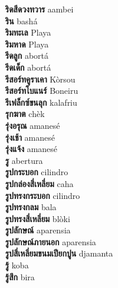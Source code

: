 \textbf{ ริดสีดวงทวาร  } aambei \\
\textbf{ ริน  } bashá \\
\textbf{ ริมทะเล  } Playa \\
\textbf{ ริมหาด  } Playa \\
\textbf{ รีดลูก  } abortá \\
\textbf{ รีดเด็ก  } abortá \\
\textbf{ รีสอร์ทคูราเคา  } Kòrsou \\
\textbf{ รีสอร์ทโบแนร์  } Boneiru \\
\textbf{ รีเฟล็กซ์ขนลุก  } kalafriu \\
\textbf{ รุกฆาต  } chèk \\
\textbf{ รุ่งอรุณ  } amanesé \\
\textbf{ รุ่งเช้า  } amanesé \\
\textbf{ รุ่งแจ้ง  } amanesé \\
\textbf{ รู  } abertura \\
\textbf{ รูปกระบอก  } cilindro \\
\textbf{ รูปกล่องสี่เหลี่ยม  } caha \\
\textbf{ รูปทรงกระบอก  } cilindro \\
\textbf{ รูปทรงกลม  } bala \\
\textbf{ รูปทรงสี่เหลี่ยม  } blòki \\
\textbf{ รูปลักษณ์  } aparensia \\
\textbf{ รูปลักษณ์ภายนอก  } aparensia \\
\textbf{ รูปสี่เหลี่ยมขนมเปียกปูน  } djamanta \\
\textbf{ รู้  } koba \\
\textbf{ รู้สึก  } bira \\
